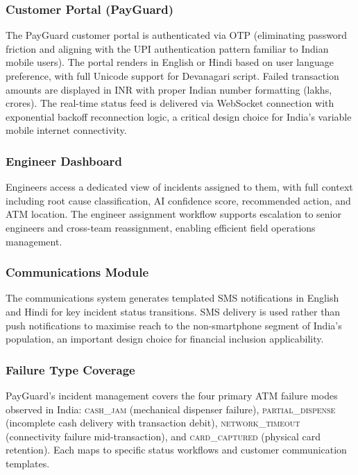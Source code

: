 \documentclass[12pt,a4paper]{article}
\begin{document}
\subsubsection{Customer Portal (PayGuard)}

The PayGuard customer portal is authenticated via OTP (eliminating password friction and
aligning with the UPI authentication pattern familiar to Indian mobile users). The portal
renders in English or Hindi based on user language preference, with full Unicode support
for Devanagari script. Failed transaction amounts are displayed in INR with proper Indian
number formatting (lakhs, crores). The real-time status feed is delivered via WebSocket
connection with exponential backoff reconnection logic, a critical design choice for India's
variable mobile internet connectivity.

\subsubsection{Engineer Dashboard}

Engineers access a dedicated view of incidents assigned to them, with full context including
root cause classification, AI confidence score, recommended action, and ATM location. The
engineer assignment workflow supports escalation to senior engineers and cross-team
reassignment, enabling efficient field operations management.

\subsubsection{Communications Module}

The communications system generates templated SMS notifications in English and Hindi for
key incident status transitions. SMS delivery is used rather than push notifications to
maximise reach to the non-smartphone segment of India's population, an important design
choice for financial inclusion applicability.

\subsubsection{Failure Type Coverage}

PayGuard's incident management covers the four primary ATM failure modes observed in India:
\textsc{cash\_jam} (mechanical dispenser failure), \textsc{partial\_dispense} (incomplete
cash delivery with transaction debit), \textsc{network\_timeout} (connectivity failure
mid-transaction), and \textsc{card\_captured} (physical card retention). Each maps to
specific status workflows and customer communication templates.
\end{document}
